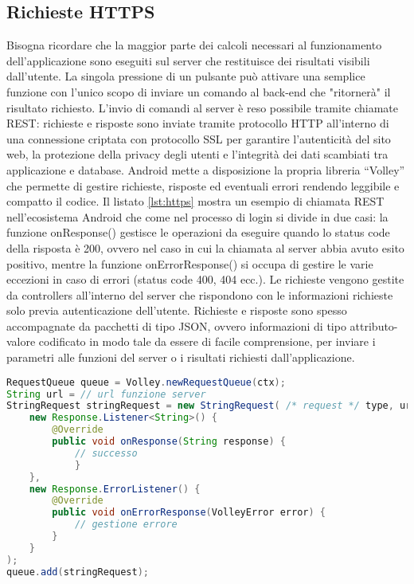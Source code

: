 \subsection{Richieste HTTPS}
Bisogna ricordare che la maggior parte dei calcoli necessari al funzionamento dell'applicazione sono eseguiti sul server che restituisce dei risultati visibili dall'utente. La singola pressione di un pulsante può attivare una semplice funzione con l'unico scopo di inviare un comando al back-end che "ritornerà" il risultato richiesto.
L’invio di comandi al server è reso possibile tramite chiamate REST: richieste e risposte sono inviate tramite protocollo HTTP all’interno di una connessione criptata con protocollo SSL per garantire l’autenticità del sito web, la protezione della privacy degli utenti e l’integrità dei dati scambiati tra applicazione e database. Android mette a disposizione la propria libreria “Volley” che permette di gestire richieste, risposte ed eventuali errori rendendo leggibile e compatto il codice. Il listato \ref{lst:https} mostra un esempio di chiamata REST nell’ecosistema Android che come nel processo di login si divide in due casi: la funzione onResponse() gestisce le operazioni da eseguire quando lo status code della risposta è 200, ovvero nel caso in cui la chiamata al server abbia avuto esito positivo, mentre la funzione onErrorResponse() si occupa di gestire le varie eccezioni in caso di errori (status code 400, 404 ecc.). 
Le richieste vengono gestite da controllers all’interno del server che rispondono con le informazioni richieste solo previa autenticazione dell'utente. Richieste e risposte sono spesso accompagnate da pacchetti di tipo JSON, ovvero informazioni di tipo attributo-valore codificato in modo tale da essere di facile comprensione, per inviare i parametri alle funzioni del server o i risultati richiesti dall’applicazione.
\bigskip
\begin{minipage}{\linewidth}
\begin{lstlisting}[language=java, caption=Esempio richiesta https,label={lst:https}]
RequestQueue queue = Volley.newRequestQueue(ctx);
String url = // url funzione server
StringRequest stringRequest = new StringRequest( /* request */ type, url,
    new Response.Listener<String>() {
        @Override
        public void onResponse(String response) {
			// successo                                               
            }
    },
    new Response.ErrorListener() {
        @Override
        public void onErrorResponse(VolleyError error) {
        	// gestione errore
        }
    }
);
queue.add(stringRequest); 
\end{lstlisting}
\end{minipage}
\FloatBarrier

